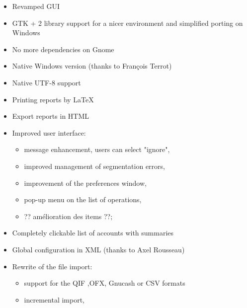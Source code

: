 \begin{itemize}

\item Revamped GUI

\item GTK + 2 library support for a nicer environment and simplified porting on Windows

\item No more dependencies on Gnome

\item Native Windows version (thanks to François Terrot)

\item Native \gls{UTF-8} support 

\item Printing reports by \gls{LaTeX}

\item Export reports in \gls{HTML}

\item Improved user interface:

\begin{itemize}

\item message enhancement, users can select "ignore",

\item improved management of segmentation errors,

\item improvement of the preferences window,

\item pop-up menu on the list of operations,

\item ?? amélioration des items ??;

\end{itemize}

\item Completely clickable list of accounts with summaries

\item Global configuration in \gls{XML} (thanks to Axel Rousseau)

\item Rewrite of the file import:

\begin{itemize}

\item support for the \gls{QIF} ,\gls{OFX}, \gls{Gnucash} or \gls{CSV}  formats

\item incremental import,


\end{itemize}
\end{itemize}
